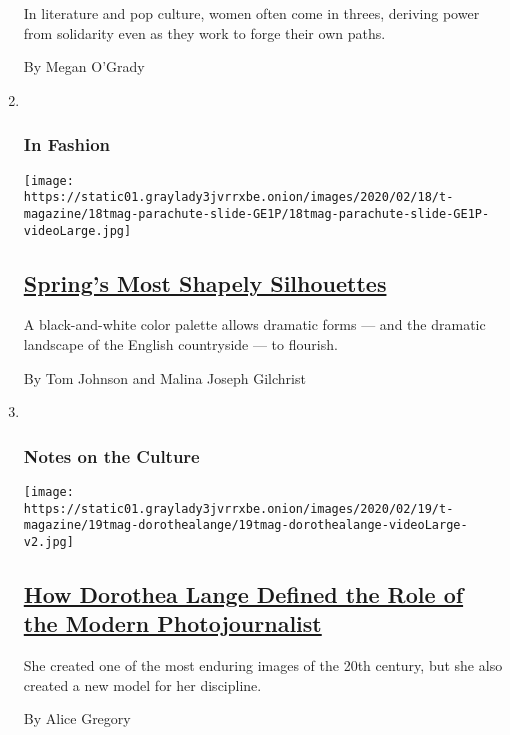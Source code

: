 \begin{enumerate}
  In literature and pop culture, women often come in threes, deriving
  power from solidarity even as they work to forge their own paths.

  By Megan O'Grady
\item ~
  \hypertarget{in-fashion-1}{%
  \subsubsection{In Fashion}\label{in-fashion-1}}

  \texttt{[image: https://static01.graylady3jvrrxbe.onion/images/2020/02/18/t-magazine/18tmag-parachute-slide-GE1P/18tmag-parachute-slide-GE1P-videoLarge.jpg]}

  \hypertarget{springs-most-shapely-silhouettes}{%
  \subsection{\texorpdfstring{\href{/2020/02/18/t-magazine/spring-fashion-silhouettes.html}{Spring's
  Most Shapely
  Silhouettes}}{Spring's Most Shapely Silhouettes}}\label{springs-most-shapely-silhouettes}}

  A black-and-white color palette allows dramatic forms --- and the
  dramatic landscape of the English countryside --- to flourish.

  By Tom Johnson and Malina Joseph Gilchrist
\item ~
  \hypertarget{notes-on-the-culture}{%
  \subsubsection{Notes on the Culture}\label{notes-on-the-culture}}

  \texttt{[image: https://static01.graylady3jvrrxbe.onion/images/2020/02/19/t-magazine/19tmag-dorothealange/19tmag-dorothealange-videoLarge-v2.jpg]}

  \hypertarget{how-dorothea-lange-defined-the-role-of-the-modern-photojournalist}{%
  \subsection{\texorpdfstring{\href{/2020/02/10/t-magazine/dorothea-lange.html}{How
  Dorothea Lange Defined the Role of the Modern
  Photojournalist}}{How Dorothea Lange Defined the Role of the Modern Photojournalist}}\label{how-dorothea-lange-defined-the-role-of-the-modern-photojournalist}}

  She created one of the most enduring images of the 20th century, but
  she also created a new model for her discipline.

  By Alice Gregory
\end{enumerate}

